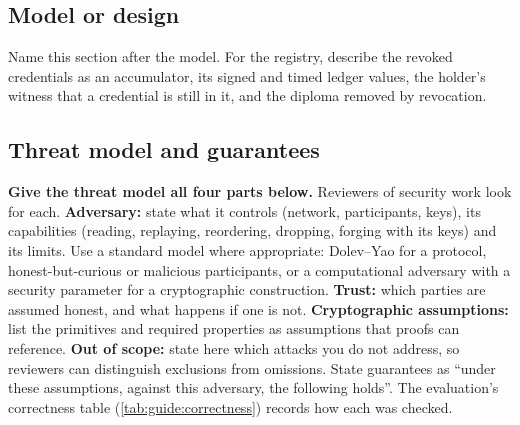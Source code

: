 \subsection{Model or design}\label{app:chapters:model}
Name this section after the model. For the registry, describe the revoked credentials as an accumulator, its signed and timed ledger values, the holder's witness that a credential is still in it, and the diploma removed by revocation.

\subsection{Threat model and guarantees}\label{app:chapters:threat-model}
\textbf{Give the threat model all four parts below.} Reviewers of security work look for each.
\textbf{Adversary:} state what it controls (network, participants, keys), its capabilities (reading, replaying, reordering, dropping, forging with its keys) and its limits. Use a standard model where appropriate: Dolev--Yao for a protocol, honest-but-curious or malicious participants, or a computational adversary with a security parameter for a cryptographic construction.
\textbf{Trust:} which parties are assumed honest, and what happens if one is not.
\textbf{Cryptographic assumptions:} list the primitives and required properties as assumptions that proofs can reference.
\textbf{Out of scope:} state here which attacks you do not address, so reviewers can distinguish exclusions from omissions.
State guarantees as \enquote{under these assumptions, against this adversary, the following holds}. The evaluation's correctness table (\cref{tab:guide:correctness}) records how each was checked.

